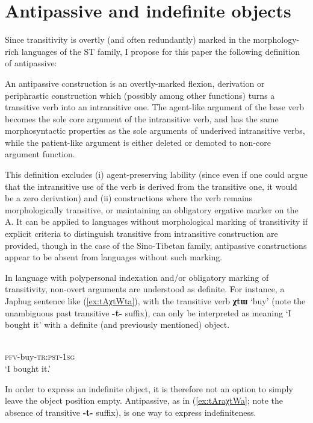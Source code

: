 \documentclass[oneside,a4paper,11pt]{article}
\newcommand{\ipa}[1]{{\phon\textbf{#1}}}
\begin{document}
\section{Antipassive and indefinite objects}
Since transitivity is overtly (and often redundantly) marked in the morphology-rich languages of the ST family, I propose for this paper the following definition of antipassive:

\begin{exe}
\ex \label{ex:def}
\glt An antipassive construction is an overtly-marked flexion, derivation or periphrastic construction which (possibly among other functions) turns a transitive verb into an intransitive one. The agent-like argument of the base verb becomes the sole core argument of the intransitive verb, and has the same morphosyntactic properties as the sole arguments of underived intransitive verbs, while the patient-like argument is either deleted or demoted to non-core argument function.
\end{exe}

This definition excludes  (i) agent-preserving lability (since even if one could argue that the intransitive use of the verb is derived from the transitive one, it would be a zero derivation) and (ii) constructions where the verb remains morphologically transitive, or maintaining an obligatory ergative marker on the A. It can be applied to languages without morphological marking of transitivity if explicit criteria to distinguish transitive from intransitive construction are provided, though in the case of the Sino-Tibetan family, antipassive constructions appear to be absent from languages without such marking.

In language with polypersonal indexation and/or obligatory marking of transitivity, non-overt arguments are understood as definite. For instance, a Japhug sentence like (\ref{ex:tAχtWta}), with the transitive verb \ipa{χtɯ} `buy' (note the unambiguous past transitive \ipa{-t-} suffix), can only be interpreted as meaning `I bought it' with a definite (and previously mentioned) object.

\begin{exe}
\ex \label{ex:tAχtWta}
\gll \ipa{tɤ-χtɯ-t-a} \\
\textsc{pfv}-buy-\textsc{tr:pst-1sg} \\
\glt `I bought it.'
\end{exe}

In order to express an indefinite object, it is therefore not an option to simply leave the object position empty. Antipassive, as in (\ref{ex:tAraχtWa}; note the absence of transitive \ipa{-t-} suffix), is one way to express indefiniteness. 
\end{document}
